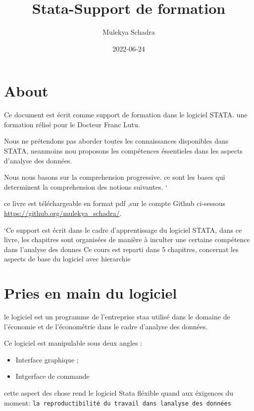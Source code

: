 \documentclass[
]{book}
\title{Stata-Support de formation}
\author{Mulekya Schadra}
\date{2022-06-24}
\providecommand{\tightlist}{%
  \setlength{\itemsep}{0pt}\setlength{\parskip}{0pt}}
\begin{document}
\maketitle

{
\setcounter{tocdepth}{1}
\tableofcontents
}
\hypertarget{about}{%
\chapter*{About}\label{about}}

Ce document est écrit comme support de formation dans le logiciel STATA. une formation rélisé pour le Docteur Franc Lutu.

Nous ne prétendons pas aborder toutes les connaissances disponibles dans STATA,
neanmoins nou proposons les compétences éssentieles dans les aspects d'analyse des données.

Nous nous basons sur la comprehension progressive. ce sont les bases qui determinent la comprehension des notions suivantes. `

ce livre est téléchargeable en format pdf ,sur le compte Github ci-sessous \url{https://github.org/mulekya_schadra/}.

`Ce support est écrit dans le cadre d'apprentissage du logiciel STATA, dans ce livre, les chapitres sont organisées de manière à inculter une certaine compétence dans l'analyse des donnes
Ce cours est reparti dans 5 chapitres, concernat les aspects de base du logiciel avec hierarchie

\hypertarget{pries-en-main-du-logiciel}{%
\chapter{Pries en main du logiciel}\label{pries-en-main-du-logiciel}}

le logiciel est un programme de l'entreprise staa utilisé dans le domaine de l'économie et de l'économétrie dans le cadre d'analyse des données.

Ce logiciel est manipulable sous deux angles :

\begin{itemize}
\tightlist
\item
  Interface graphique ;
\item
  Intgerface de commande
\end{itemize}

cette aspect des chose rend le logiciel Stata fléxible quand aux éxigences du moment: \texttt{la\ reproductibilité\ du\ travail\ dans\ l\textquotesingle{}analyse\ des\ données}
\end{document}
